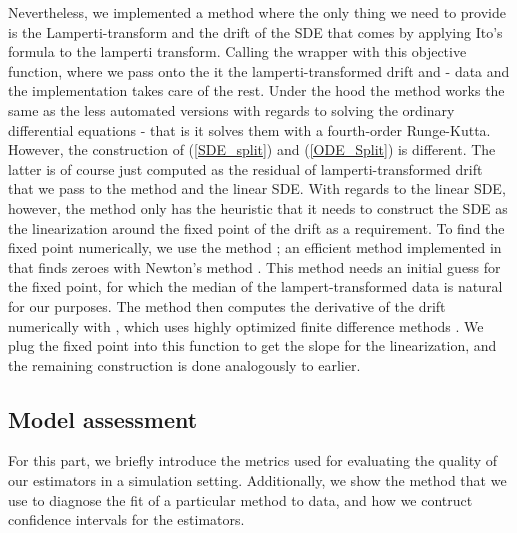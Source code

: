 Nevertheless, we implemented a method where the only thing we need to provide is the Lamperti-transform and the drift of the SDE that comes by applying Ito's formula to the lamperti transform. Calling the wrapper with this objective function, where we pass onto the it the lamperti-transformed drift and - data and the implementation takes care of the rest. Under the hood the method works the same as the less automated versions with regards to solving the ordinary differential equations - that is it solves them with a fourth-order Runge-Kutta. However, the construction of (\ref{SDE_split}) and (\ref{ODE_Split}) is different. The latter is of course just computed as the residual of lamperti-transformed drift that we pass to the method and the linear SDE. With regards to the linear SDE, however, the method only has the heuristic that it needs to construct the SDE as the linearization around the fixed point of the drift as a requirement. To find the fixed point numerically, we use the method ; an efficient method implemented in  that finds zeroes with Newton's method \cite{nleqslv}. This method needs an initial guess for the fixed point, for which the median of the lampert-transformed data is natural for our purposes. The method then computes the derivative of the drift numerically with , which uses highly optimized finite difference methods \cite{numDeriv}. We plug the fixed point into this function to get the slope for the linearization, and the remaining construction is done analogously to earlier.
\subsection{Model assessment}
For this part, we briefly introduce the metrics used for evaluating the quality of our estimators in a simulation setting. Additionally, we show the method that we use to diagnose the fit of a particular method to data, and how we contruct confidence intervals for the estimators.
